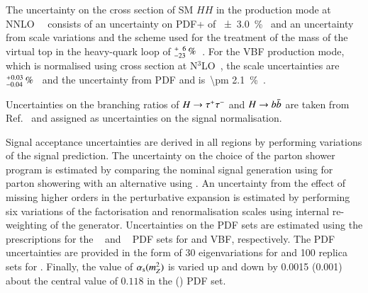 The uncertainty on the cross section of SM $HH$ in the \ggF production mode at
NNLO~\FTapprox~\cite{Grazzini:2018bsd} consists of an uncertainty on PDF+\alphas
of \SI{\pm 3.0}{\percent}~\cite{LHCHWGHH} and an uncertainty from scale
variations and the scheme used for the treatment of the mass of the virtual top
in the heavy-quark loop of
$^{\hspace{0.25pt}+\hspace{0.25pt}\phantom{2}6}_{-23}\,\si{\percent}$~\cite{Baglio:2020wgt}. For
the VBF production mode, which is normalised using cross section at
N$^3$LO~\cite{Dreyer:2018qbw}, the scale uncertainties
are~$^{\hspace{0.25pt}+\hspace{0.25pt}0.03}_{-0.04}\,\si{\percent}$~\cite{LHCHWGHH}
and the uncertainty from PDF and \alphas is~\SI{\pm
  2.1}{\percent}~\cite{LHCHWGHH}.

Uncertainties on the branching ratios of $H \to \tau^{+} \tau^{-}$ and $H \to b\bar{b}$ are
taken from Ref.~\cite{deFlorian:2016spz} and assigned as uncertainties on the
signal normalisation.

Signal acceptance uncertainties are derived in all regions by performing
variations of the signal prediction.
The uncertainty on the choice of the parton shower program is estimated by
comparing the nominal signal generation using \PYTHIA[8.244] for parton
showering with an alternative using \HERWIG[7.1.6]. An uncertainty from the
effect of missing higher orders in the perturbative expansion is estimated by
performing six variations of the factorisation and renormalisation scales using
internal re-weighting of the generator. Uncertainties on the PDF sets are
estimated using the prescriptions for the
\PDFforLHC[15nlo]~\cite{Butterworth:2015oua} and
\NNPDF[3.0nlo]~\cite{Ball:2014uwa} PDF sets for \ggF and VBF, respectively. The
PDF uncertainties are provided in the form of 30 eigenvariations for
\PDFforLHC[15nlo] and 100 replica sets for \NNPDF[3.0nlo]. Finally, the value of
$\alpha_{\text{s}}(m_{Z}^2)$ is varied up and down by 0.0015 (0.001) about the central value
of $0.118$ in the \PDFforLHC[15nlo] (\NNPDF[3.0nlo]) PDF set.


